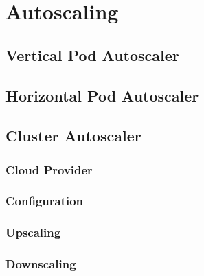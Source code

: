 \section{Autoscaling}
\label{sec:implementation_autoscaling}

\subsection{Vertical Pod Autoscaler}
\label{subsec:implementation_autoscaling_vertical_pod_autoscaler}

\subsection{Horizontal Pod Autoscaler}
\label{subsec:implementation_autoscaling_horizontal_pod_autoscaler}

\subsection{Cluster Autoscaler}
\label{subsec:implementation_autoscaling_cluster_autoscaler}

\subsubsection{Cloud Provider}
\label{subsubsec:implementation_autoscaling_cluster_autoscaler_cloud_provider}

\subsubsection{Configuration}
\label{subsubsec:implementation_autoscaling_cluster_autoscaler_configuration}


\subsubsection{Upscaling}
\label{subsubsec:implementation_autoscaling_cluster_autoscaler_upscaling}

\subsubsection{Downscaling}
\label{subsubsec:implementation_autoscaling_cluster_autoscaler_downscaling}